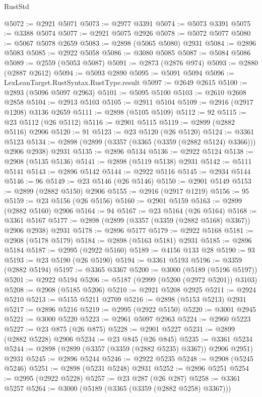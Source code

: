 \begin{lexlean}{RustStd}
\begin{coremodule}
@5072 := @2921 @5071
@5073 := @2977 @3391
@5074 := @5073 @3391
@5075 := @3388 @5074
@5077 := @2921 @5075 @2926
@5078 := @5072 @5077
@5080 := @5067 @5078 @2659
@5083 := @2898 (@5065 @5080) @2931
@5084 := @2896 @5083
@5085 := @2922 @5058
@5086 := @3080 @5085
@5087 := @5084 @5086
@5089 := @2559 (@5053 @5087)
@5091 := @2873 (@2876 @974)
@5093 := @2880 (@2887 @2612)
@5094 := @5093 @2890
@5095 := @5091 @5094
@5096 := LexLeanTarget.RustSyntax.RustType.result
@5097 := @2649 @2615
@5100 := @2893 (@5096 @5097 @2963)
@5101 := @5095 @5100
@5103 := @2610 @2608 @2858
@5104 := @2913 @5103
@5105 := @2911 @5104
@5109 := @2916 (@2917 @1208) @3136 @2659
@5111 := @2898 (@5105 @5109)
@5112 := 92
@5115 := @23 @5112 (@26 @5112)
@5116 := @2901 @5115
@5119 := @2899 (@2882 @5116) @2906
@5120 := 91
@5123 := @23 @5120 (@26 @5120)
@5124 := @3361 @5123
@5134 := @2898 (@2899 (@3357 (@3365 (@3359 (@2882 @5124) @3366))) @2906 @2938) @2931
@5135 := @2896 @5134
@5136 := @2922 @5124
@5138 := @2908 (@5135 @5136)
@5141 := @2898 (@5119 @5138) @2931
@5142 := @5111 @5141
@5143 := @2896 @5142
@5144 := @2922 @5116
@5145 := @2934 @5144
@5146 := 96
@5149 := @23 @5146 (@26 @5146)
@5150 := @2901 @5149
@5153 := @2899 (@2882 @5150) @2906
@5155 := @2916 (@2917 @1219)
@5156 := 95
@5159 := @23 @5156 (@26 @5156)
@5160 := @2901 @5159
@5163 := @2899 (@2882 @5160) @2906
@5164 := 94
@5167 := @23 @5164 (@26 @5164)
@5168 := @3361 @5167
@5177 := @2898 (@2899 (@3357 (@3359 (@2882 @5168) @3367)) @2906 @2938) @2931
@5178 := @2896 @5177
@5179 := @2922 @5168
@5181 := @2908 (@5178 @5179)
@5184 := @2898 (@5163 @5181) @2931
@5185 := @2896 @5184
@5187 := @2995 (@2922 @5160)
@5189 := @4156 @133 @28
@5190 := 93
@5193 := @23 @5190 (@26 @5190)
@5194 := @3361 @5193
@5196 := @3359 (@2882 @5194)
@5197 := @3365 @3367
@5200 := @3000 (@5189 (@5196 @5197))
@5201 := @2922 @5194
@5206 := @5187 (@2999 (@5200 (@2972 @5201)) @3103)
@5208 := @2908 (@5185 @5206)
@5210 := @2921 @5208 @2925
@5211 := @2924 @5210
@5213 := @5155 @5211 @2709
@5216 := @2898 (@5153 @5213) @2931
@5217 := @2896 @5216
@5219 := @2995 (@2922 @5150)
@5220 := @3001 @2945
@5221 := @3000 @5220
@5223 := @2961 @5097 @2963
@5224 := @2960 @5223
@5227 := @23 @875 (@26 @875)
@5228 := @2901 @5227
@5231 := @2899 (@2882 @5228) @2906
@5234 := @23 @845 (@26 @845)
@5235 := @3361 @5234
@5244 := @2898 (@2899 (@3357 (@3359 (@2882 @5235) @3367)) @2906 @2951) @2931
@5245 := @2896 @5244
@5246 := @2922 @5235
@5248 := @2908 (@5245 @5246)
@5251 := @2898 (@5231 @5248) @2931
@5252 := @2896 @5251
@5254 := @2995 (@2922 @5228)
@5257 := @23 @287 (@26 @287)
@5258 := @3361 @5257
@5264 := @3000 (@5189 (@3365 (@3359 (@2882 @5258) @3367)))

\end{coremodule}
\end{lexlean}
